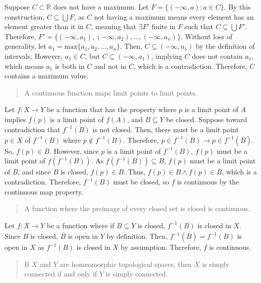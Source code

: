 \documentclass[12pt]{extarticle}
\begin{document}
\noindent Suppose $C\subset \mathbb{R}$ does not have a maximum. Let $F = \{(-\infty,a):a\in C\}$. By this construction, $C\subseteq \bigcup F$, as $C$ not having a maximum means every element has an element greater than it in $C$, meaning that $\exists F'$ finite in $F$ such that $C\subseteq \bigcup F'$. Therefore, $F' = \{(-\infty,a_1),(-\infty,a_2),\dots,(-\infty,a_n)\}$. Without loss of generality, let $a_1 = \textrm{max}\{a_1,a_2,\dots,a_n\}$. Then, $C\subseteq (-\infty,a_1)$ by the definition of intervals. However, $a_1\in C$, but $C\subseteq (-\infty,a_1)$, implying $C$ does not contain $a_1$, which means $a_1$ is both in $C$ and not in $C$, which is a contradiction. Therefore, $C$ contains a maximum value.
  \begin{quote}
    A continuous function maps limit points to limit points.
  \end{quote}
  Let $f:X\rightarrow Y$ be a function that has the property where $p$ is a limit point of $A$ implies $f(p)$ is a limit point of $f(A)$, and $B\subseteq Y$ be closed. Suppose toward contradiction that $f^{-1}(B)$ is not closed. Then, there must be a limit point $p\in X$ of $f^{-1}(B)$ where $p\not\in f^{-1}(B)$. Therefore, $p\in \overline{f^{-1}(B)} \rightarrow p\in f^{-1}(\overline{B})$. So, $f(p)\in \overline{B}$. However, since $p$ is a limit point of $f^{-1}(B)$, $f(p)$ must be a limit point of $f(f^{-1}(B))$. As $f(f^{-1}(B))\subseteq B$, $f(p)$ must be a limit point of $B$, and since $B$ is closed, $f(p)\in B$. Thus, $f(p)\in B\land f(p)\in \overline{B}$, which is a contradiction. Therefore, $f^{-1}(B)$ must be closed, so $f$ is continuous by the continuous map property. 
  \begin{quote}
    A function where the preimage of every closed set is closed is continuous. 
  \end{quote}
Let $f:X\rightarrow Y$ be a function where if $B\subseteq Y$ is closed, $f^{-1}(B)$ is closed in $X$. Since $B$ is closed, $\overline{B}$ is open in $Y$ by definition. Then, $f^{-1}(\overline{B}) = \overline{f^{-1}(B)}$ is open in $X$ as $f^{-1}(B)$ is closed in $X$ by assumption. Therefore, $f$ is continuous.
  \begin{quote}
    If $X$ and $Y$ are homeomorphic topological spaces, then $X$ is simply connected if and only if $Y$ is simply connected.
  \end{quote}
\end{document}
